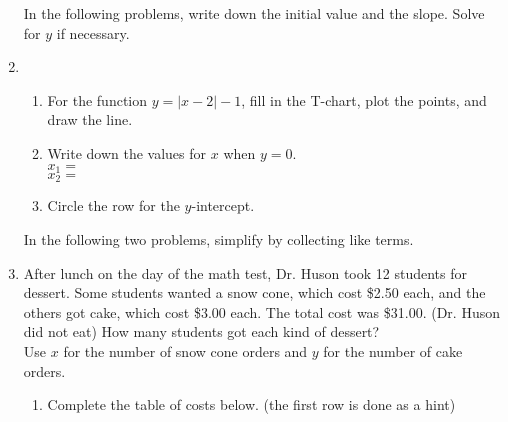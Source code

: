 \documentclass[12pt, oneside]{article}
\begin{document}
\begin{enumerate}
\newpage

In the following problems, write down the initial value and the slope. Solve for $y$ if necessary.

\newpage

\item
\begin{enumerate}
  \item For the function $y= |x-2|-1$, fill in the T-chart, plot the points, and draw the line.
    \begin{center} %
    \end{center}
    \item Write down the values for $x$ when $y=0$.\\[0.5cm]
    $x_1=$\\[0.5cm]
    $x_2=$\\[0.5cm]
    \item Circle the row for the $y$-intercept.
\end{enumerate}
\vspace{1cm}

In the following two problems, simplify by collecting like terms.

\newpage

  \item After lunch on the day of the math test, Dr. Huson took 12 students for dessert. Some students wanted a snow cone, which cost \$2.50 each, and the others got cake, which cost \$3.00 each. The total cost was \$31.00. (Dr. Huson did not eat) How many students got each kind of dessert? \\[0.5cm]
  Use $x$ for the number of snow cone orders and $y$ for the number of cake orders.
  \begin{enumerate}
    \item Complete the table of costs below. (the first row is done as a hint)


\end{enumerate}
\end{enumerate}
\end{document}
